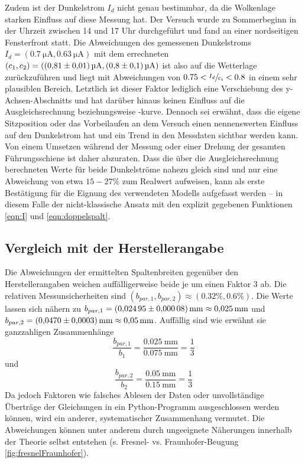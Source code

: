 Zudem ist der Dunkelstrom $I_d$ nicht genau bestimmbar, da die Wolkenlage starken Einfluss auf diese Messung hat. Der Versuch wurde zu Sommerbeginn in der Uhrzeit zwischen
14 und 17 Uhr durchgeführt und fand an einer nordseitigen Fensterfront statt.
Die Abweichungen des gemessenen Dunkelstroms $I_d = (\SI{0.7}{\micro\ampere}, \SI{0.63}{\micro\ampere}) $ mit dem errechneten $(c_1, c_2) = (\SI{0.81\pm0.01}{\micro\ampere}, \SI{0.8\pm0.1}{\micro\ampere})$
ist also auf die Wetterlage zurückzuführen und liegt mit Abweichungen von $0.75 < \sfrac{I_d}{c_i} < 0.8$ in einem sehr plausiblen Bereich.
Letztlich ist dieser Faktor lediglich eine Verschiebung des y-Achsen-Abschnitts und hat darüber hinaus keinen Einfluss auf die Ausgleichsrechnung beziehungsweise -kurve.
Dennoch sei erwähnt, dass die eigene Sitzposition oder das Vorbeilaufen an dem Versuch einen nennenswerten Einfluss auf den Dunkelstrom hat und ein Trend in den Messdaten sichtbar werden kann.
Von einem Umsetzen während der Messung oder einer Drehung der gesamten Führungsschiene ist daher abzuraten.
Dass die über die Ausgleichsrechnung berechneten Werte für beide Dunkelströme nahezu gleich sind und nur eine Abweichung von etwa $15-27\%$ zum Realwert aufweisen, kann als erste Bestätigung für die Eignung des verwendeten Modells aufgefasst werden -- in diesem Falle der
nicht-klassische Ansatz mit den explizit gegebenen Funktionen \eqref{eqn:I} und \eqref{eqn:doppelspalt}.

\subsection{Vergleich mit der Herstellerangabe}
Die Abweichungen der ermittelten Spaltenbreiten gegenüber den Herstellerangaben weichen auffälligerweise beide je um einen Faktor 3 ab. Die relativen Messunsicherheiten sind
$(b_{par, 1}, b_{par, 2}) \approx (0.32\%, 0.6\%)$. Die Werte lassen sich nähern zu $b_{par, 1} = \SI{0.02495 \pm 0.00008}{\milli\meter} \approx \SI{0.025}{\milli\meter}$ und
$b_{par, 2} = \SI{0.0470 \pm 0.0003}{\milli\meter} \approx \SI{0.05}{\milli\meter}$.
Auffällig sind wie erwähnt sie ganzzahligen Zusammenhänge 
\begin{equation*}
    \dfrac{b_{par, 1}}{b_1} = \dfrac{\SI{0.025}{\milli\meter}}{\SI{0.075}{\milli\meter}} = \frac{1}{3}
\end{equation*}
und
\begin{equation*}
    \dfrac{b_{par, 2}}{b_2} = \dfrac{\SI{0.05}{\milli\meter}}{\SI{0.15}{\milli\meter}} = \frac{1}{3}
\end{equation*}
Da jedoch Faktoren wie falsches Ablesen der Daten oder unvollständige Überträge der Gleichungen in ein Python-Programm ausgeschlossen werden können,
wird ein anderer, systematischer Zusammenhang vermutet.
Die Abweichungen können unter anderem durch ungeeignete Näherungen innerhalb der Theorie selbst entstehen (s. Fresnel- vs. Fraunhofer-Beugung \ref{fig:fresnelFraunhofer}). \\


